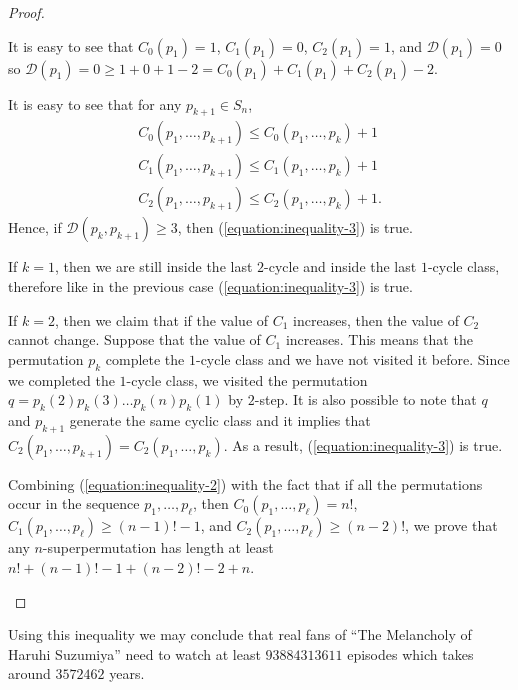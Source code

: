 \begin{proof}
\begin{itemize}
      It is easy to see that $C_0(p_1) = 1$, $C_1(p_1) = 0$, $C_2(p_1) = 1$, and
      $\mathcal{D}(p_1) = 0$ so
      $\mathcal{D}(p_1) = 0 \ge 1 + 0 + 1 - 2 =
      C_0(p_1) + C_1(p_1) + C_2(p_1)- 2$.

      It is easy to see that for any $p_{k + 1} \in S_n$,
      \begin{gather*}
        C_0(p_1, \dots, p_{k + 1}) \le C_0(p_1, \dots, p_k) + 1  \\
        C_1(p_1, \dots, p_{k + 1}) \le C_1(p_1, \dots, p_k) + 1 \\
        C_2(p_1, \dots, p_{k + 1}) \le C_2(p_1, \dots, p_k) + 1.
      \end{gather*}
      Hence, if $\mathcal{D}(p_k, p_{k + 1}) \ge 3$, then
      (\ref{equation:inequality-3}) is true.

      If $k = 1$, then we are still
      inside the last $2$-cycle and inside the last $1$-cycle class, therefore
      like in the previous case (\ref{equation:inequality-3}) is true.

      If $k = 2$, then we claim that if the value of $C_1$ increases, then
      the value of $C_2$ cannot change. Suppose that the value of $C_1$
      increases. This means that the permutation $p_k$ complete the $1$-cycle
      class and we have not visited it before. Since we
      completed the $1$-cycle class, we visited the permutation
      $q = p_k(2) p_k(3) \dots p_k(n) p_k(1)$ by $2$-step.
      It is also possible to note that $q$ and
      $p_{k + 1}$ generate the same cyclic class and it
      implies that $C_2(p_1, \dots, p_{k + 1}) = C_2(p_1, \dots, p_k)$.
      As a result, (\ref{equation:inequality-3}) is true.

      Combining (\ref{equation:inequality-2}) with the
      fact that if all the
      permutations occur in the sequence $p_1, \dots, p_\ell$, then
      $C_0(p_1, \dots, p_\ell) = n!$, $C_1(p_1, \dots, p_\ell) \ge
      (n - 1)! - 1$, and $C_2(p_1, \dots, p_\ell) \ge (n - 2)!$,
      we prove that any $n$-superpermutation has length at least
      $n! + (n - 1)! - 1 + (n - 2)! - 2 + n$.
  \end{itemize}
\end{proof}

Using this inequality we may conclude that real fans of
``The Melancholy of Haruhi Suzumiya'' need to watch at least $93884313611$
episodes which takes around $3572462$ years.


